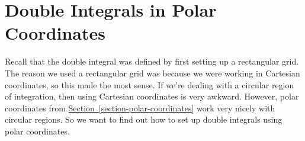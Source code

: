 \documentclass[10pt,]{book}
\numberwithin{equation}{section}
\begin{document}
\section[{Double Integrals in Polar Coordinates}]{Double Integrals in Polar Coordinates}\label{section-double-integrals-in-polar-coordinates}
\hypertarget{p-1484}{}%
Recall that the double integral was defined by first setting up a rectangular grid. The reason we used a rectangular grid was because we were working in Cartesian coordinates, so this made the most sense. If we're dealing with a circular region of integration, then using Cartesian coordinates is very awkward. However, polar coordinates from \hyperref[section-polar-coordinates]{Section~\ref{section-polar-coordinates}} work very nicely with circular regions. So we want to find out how to set up double integrals using polar coordinates.%
\par
\hypertarget{p-1485}{}%
\end{document}
